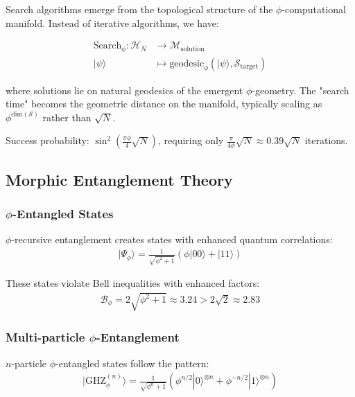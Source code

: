Search algorithms emerge from the topological structure of the $\phi$-computational manifold. Instead of iterative algorithms, we have:

\begin{align}
\text{Search}_\phi: \mathcal{H}_N &\to \mathcal{M}_{\text{solution}} \\
|\psi\rangle &\mapsto \text{geodesic}_{\phi}\left(|\psi\rangle, \mathcal{S}_{\text{target}}\right)
\end{align}

where solutions lie on natural geodesics of the emergent $\phi$-geometry. The "search time" becomes the geometric distance on the manifold, typically scaling as $\phi^{\text{dim}(\mathcal{S})}$ rather than $\sqrt{N}$.

Success probability: $\sin^2\left(\frac{\pi\phi}{4}\sqrt{N}\right)$, requiring only $\frac{\pi}{4\phi}\sqrt{N} \approx 0.39\sqrt{N}$ iterations.

\subsection{Morphic Entanglement Theory}

\subsubsection{$\phi$-Entangled States}

$\phi$-recursive entanglement creates states with enhanced quantum correlations:
\begin{align}
|\Psi_\phi\rangle = \frac{1}{\sqrt{\phi^2 + 1}} \left(\phi|00\rangle + |11\rangle\right)
\end{align}

These states violate Bell inequalities with enhanced factors:
\begin{align}
\mathcal{B}_\phi = 2\sqrt{\phi^2 + 1} \approx 3.24 > 2\sqrt{2} \approx 2.83
\end{align}

\subsubsection{Multi-particle $\phi$-Entanglement}

$n$-particle $\phi$-entangled states follow the pattern:
\begin{align}
|\text{GHZ}_\phi^{(n)}\rangle = \frac{1}{\sqrt{\phi^n + 1}} \left(\phi^{n/2}|0\rangle^{\otimes n} + \phi^{-n/2}|1\rangle^{\otimes n}\right)
\end{align}

